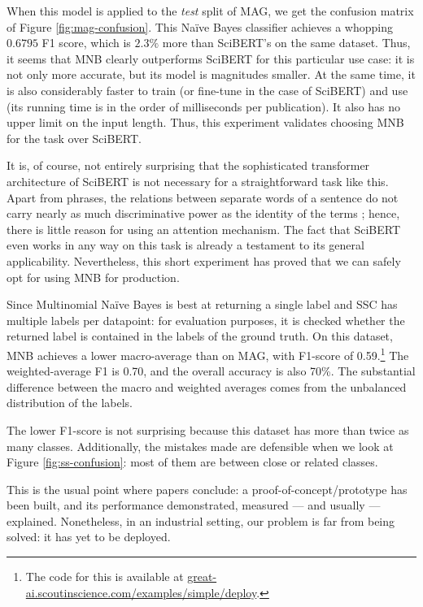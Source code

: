 When this model is applied to the \textit{test} split of MAG, we get the confusion matrix of Figure \ref{fig:mag-confusion}. This Naïve Bayes classifier achieves a whopping $0.6795$ F1 score, which is $2.3\%$ more than SciBERT's on the same dataset. Thus, it seems that MNB clearly outperforms SciBERT for this particular use case: it is not only more accurate, but its model is magnitudes smaller. At the same time, it is also considerably faster to train (or fine-tune in the case of SciBERT) and use (its running time is in the order of milliseconds per publication). It also has no upper limit on the input length. Thus, this experiment validates choosing MNB for the task over SciBERT.

It is, of course, not entirely surprising that the sophisticated transformer architecture of SciBERT is not necessary for a straightforward task like this. Apart from phrases, the relations between separate words of a sentence do not carry nearly as much discriminative power as the identity of the terms \cite{hand2001idiot}; hence, there is little reason for using an attention mechanism. The fact that SciBERT even works in any way on this task is already a testament to its general applicability. Nevertheless, this short experiment has proved that we can safely opt for using MNB for production.

Since Multinomial Naïve Bayes is best at returning a single label and SSC has multiple labels per datapoint: for evaluation purposes, it is checked whether the returned label is contained in the labels of the ground truth. On this dataset, MNB achieves a lower macro-average than on MAG, with F1-score of 0.59.\footnote{The code for this is available at \href{https://great-ai.scoutinscience.com/examples/simple/deploy}{great-ai.scoutinscience.com/examples/simple/deploy}.} The weighted-average F1 is 0.70, and the overall accuracy is also 70\%. The substantial difference between the macro and weighted averages comes from the unbalanced distribution of the labels.

The lower F1-score is not surprising because this dataset has more than twice as many classes. Additionally, the mistakes made are defensible when we look at Figure \ref{fig:ss-confusion}: most of them are between close or related classes.

\begin{displayquote}
This is the usual point where papers conclude: a proof-of-concept/prototype has been built, and its performance demonstrated, measured --- and usually --- explained. Nonetheless, in an industrial setting, our problem is far from being solved: it has yet to be deployed.
\end{displayquote}


